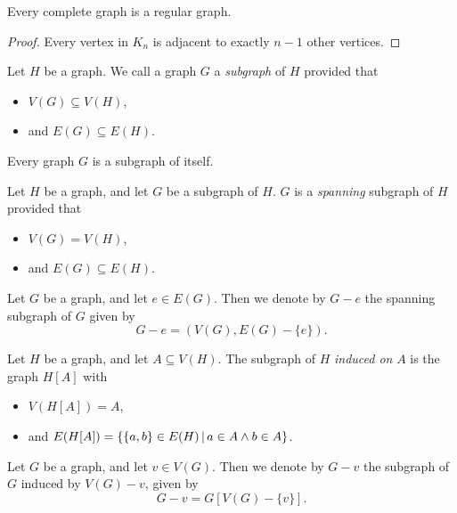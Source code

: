 \begin{prop}
    Every complete graph is a regular graph.
\end{prop}

\begin{proof}
    Every vertex in $K_n$ is adjacent to exactly $n-1$ other vertices.
\end{proof}

\begin{defn}
    Let $H$ be a graph. We call a graph $G$ a \emph{subgraph} of $H$ provided that
    \begin{itemize}
        \item $V(G) \subseteq V(H)$,
        \item and $E(G) \subseteq E(H)$.
    \end{itemize}
\end{defn}

\begin{rmk}
    Every graph $G$ is a subgraph of itself.
\end{rmk}

\begin{defn}
    Let $H$ be a graph, and let $G$ be a subgraph of $H$. $G$ is a \emph{spanning} subgraph of $H$ provided that
    \begin{itemize}
        \item $V(G) = V(H)$,
        \item and $E(G) \subseteq E(H)$.
    \end{itemize}
\end{defn}

\begin{defn}
    Let $G$ be a graph, and let $e \in E(G)$. Then we denote by $G - e$ the spanning subgraph of $G$ given by \[G - e = (V(G), E(G) - \{e\}).\]
\end{defn}

\begin{defn}
    Let $H$ be a graph, and let $A \subseteq V(H)$. The subgraph of $H$ \emph{induced on} $A$ is the graph $H[A]$ with
    \begin{itemize}
        \item $V(H[A]) = A$,
        \item and $E(H[A]) = \left\{\{a, b\} \in E(H) \,\middle|\, a \in A \land b \in A\right\}$.
    \end{itemize}
\end{defn}

\begin{defn}
    Let $G$ be a graph, and let $v \in V(G)$. Then we denote by $G - v$ the subgraph of $G$ induced by $V(G) - v$, given by \[G - v = G[V(G) - \{v\}].\]
\end{defn}

